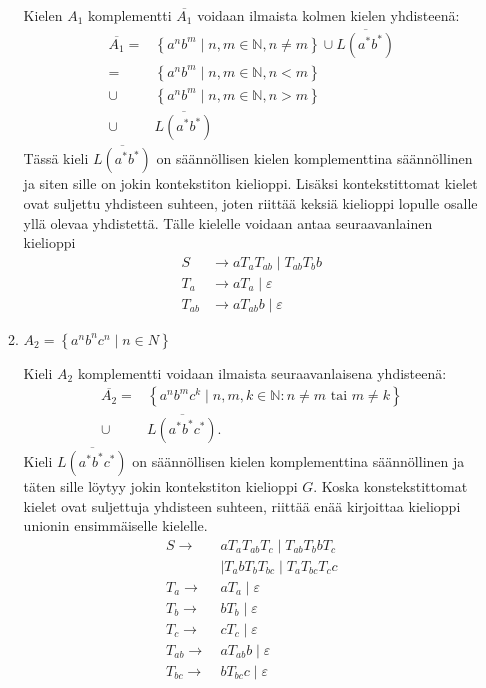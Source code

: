 \documentclass[a4paper,11pt]{article}
\newcommand{\set}[1]{{\left\{ #1 \right\}}}
\newcommand{\Nat}{\mathbb{N}}
\begin{document}
\begin{enumerate}
\begin{enumerate}
    Kielen $A_1$ komplementti $\overline{A_1}$ voidaan ilmaista kolmen
    kielen yhdisteenä:
    \begin{align*}
      \overline{A_1}
      =    & \set{a^nb^m \mid n,m \in \Nat, n \neq m}
             \cup \overline{L(a^*b^*)}\\
      =    & \set{a^nb^m \mid n,m \in \Nat, n < m} \\
      \cup & \set{a^nb^m \mid n,m \in \Nat, n > m} \\
      \cup & \overline{L(a^*b^*)}
    \end{align*}
    Tässä kieli $\overline{L(a^*b^*)}$ on säännöllisen kielen komplementtina
    säännöllinen ja siten sille on jokin kontekstiton kielioppi. Lisäksi
    kontekstittomat kielet ovat suljettu yhdisteen suhteen, joten riittää
    keksiä kielioppi lopulle osalle yllä olevaa yhdistettä.  Tälle kielelle
    voidaan antaa seuraavanlainen kielioppi
    \begin{align*}
      S      & \to aT_aT_{ab} \mid T_{ab} T_b b \\
      T_a    & \to aT_a       \mid \varepsilon  \\
      T_{ab} & \to aT_{ab}b   \mid \varepsilon
    \end{align*}

  \item
    $A_2 = \set{a^n b^n c^n \mid n \in N}$

    Kieli $A_2$ komplementti voidaan ilmaista seuraavanlaisena
    yhdisteenä:
    \begin{align*}
      \overline{A_2}
         = & \set{a^nb^mc^k \mid n,m,k \in \Nat : n \neq m \text{ tai }
                                                  m \neq k} \\
      \cup & \overline{L(a^*b^*c^*)} \text{.}
    \end{align*}
    Kieli $\overline{L(a^*b^*c^*)}$ on säännöllisen kielen komplementtina
    säännöllinen ja täten sille löytyy jokin kontekstiton kielioppi $G$. Koska
    konstekstittomat kielet ovat suljettuja yhdisteen suhteen, riittää enää
    kirjoittaa kielioppi unionin ensimmäiselle kielelle.
    \begin{align*}
      S \to\      & aT_aT_{ab}T_c \mid T_{ab}T_bbT_c \\
                  & \mid T_abT_{b}T_{bc} \mid T_aT_{bc}T_cc \\
      T_a \to\    & aT_a \mid \varepsilon \\
      T_b \to\    & bT_b \mid \varepsilon \\
      T_c \to\    & cT_c \mid \varepsilon \\
      T_{ab} \to\ & aT_{ab}b \mid \varepsilon \\
      T_{bc} \to\ & bT_{bc}c \mid \varepsilon
    \end{align*}
  \end{enumerate}
\end{enumerate}
\end{document}
